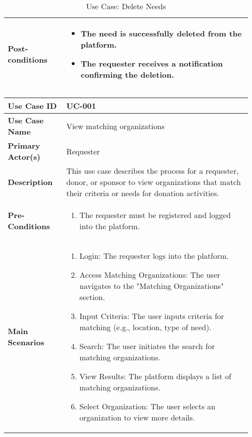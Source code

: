 \begin{table}[!ht]
\begin{tabularx}{\textwidth}{|l|X|}
        \hline
        \textbf{Post-conditions} & 
        \begin{itemize}[label=--,itemsep=0pt]
            \item The need is successfully deleted from the platform.
            \item The requester receives a notification confirming the deletion.
        \end{itemize} \\
        \hline
    \end{tabularx}
    \caption{Use Case: Delete Needs}
    \label{tab:use-case-register}
\end{table}


\begin{table}[!ht]
    \centering
    \renewcommand{\arraystretch}{1.3} %
    \begin{tabularx}{\textwidth}{|l|X|}
        \hline
        \textbf{Use Case ID} & UC-001 \\
        \hline
        \textbf{Use Case Name} & View matching organizations \\
        \hline
        \textbf{Primary Actor(s)} & Requester \\
        \hline
        \textbf{Description} & This use case describes the process for a requester, donor, or sponsor to view organizations that match their criteria or needs for donation activities.\\
        \hline
        \textbf{Pre-Conditions} & 
        \begin{enumerate}[label=\arabic*.,itemsep=0pt]
            \item The requester must be registered and logged into the platform.
        \end{enumerate} \\
        \hline
        \textbf{Main Scenarios} & 
        \begin{enumerate}[label=\arabic*.,itemsep=0pt]
            \item Login: The requester logs into the platform.
            \item Access Matching Organizations: The user navigates to the "Matching Organizations" section.
            \item Input Criteria: The user inputs criteria for matching (e.g., location, type of need).
            \item Search: The user initiates the search for matching organizations.
            \item View Results: The platform displays a list of matching organizations.
            \item Select Organization: The user selects an organization to view more details.
        \end{enumerate} \\
        

\end{tabularx}
\end{table}
